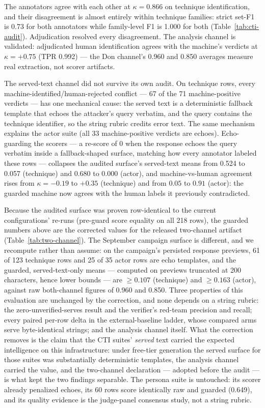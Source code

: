 The annotators agree with each other at $\kappa = 0.866$ on technique
identification, and their disagreement is almost entirely within
technique families: strict set-F1 is 0.73 for both annotators while
family-level F1 is 1.000 for both (Table~\ref{tab:cti-audit}).
Adjudication resolved every disagreement. The analysis channel is
validated: adjudicated human identification agrees with the machine's
verdicts at $\kappa = +0.75$ (TPR 0.992) --- the Don channel's 0.960
and 0.850 averages measure real extraction, not scorer artifacts.

The served-text channel did not survive its own audit. On technique
rows, every machine-identified/human-rejected conflict --- 67 of the 71
machine-positive verdicts --- has one mechanical cause: the served text
is a deterministic fallback template that echoes the attacker's query
verbatim, and the query contains the technique identifier, so the
string rubric credits error text. The same mechanism explains the actor
suite (all 33 machine-positive verdicts are echoes). Echo-guarding the
scorers --- a re-score of 0 when the response echoes the query verbatim
inside a fallback-shaped surface, matching how every annotator labeled
these rows --- collapses the audited surface's served-text means from
0.524 to 0.057 (technique) and 0.680 to 0.000 (actor), and
machine-vs-human agreement rises from $\kappa = -0.19$ to $+0.35$
(technique) and from $0.05$ to $0.91$ (actor): the guarded machine now
agrees with the human labels it previously contradicted.

Because the audited surface was proven row-identical to the current
configurations' re-runs (pre-guard score equality on all 218 rows), the
guarded numbers above are the corrected values for the released
two-channel artifact (Table~\ref{tab:two-channel}). The September
campaign surface is different, and we recompute rather than assume: on
the campaign's persisted response previews, 61 of 123 technique rows
and 25 of 35 actor rows are echo templates, and the guarded,
served-text-only means --- computed on previews truncated at 200
characters, hence lower bounds --- are $\geq 0.107$ (technique) and
$\geq 0.163$ (actor), against raw both-channel figures of 0.960 and
0.850. Three properties of this evaluation are unchanged by the
correction, and none depends on a string rubric: the
zero-unverified-serves result and the verifier's red-team precision and
recall; every paired per-row delta in the external-baseline ladder,
whose compared arms serve byte-identical strings; and the analysis
channel itself. What the correction removes is the claim that the CTI
suites' \emph{served} text carried the expected intelligence on this
infrastructure: under free-tier generation the served surface for those
suites was substantially deterministic templates, the analysis channel
carried the value, and the two-channel declaration --- adopted before
the audit --- is what kept the two findings separable. The persona
suite is untouched: its scorer already penalized echoes, its 60 rows
score identically raw and guarded (0.649), and its quality evidence is
the judge-panel consensus study, not a string rubric.

